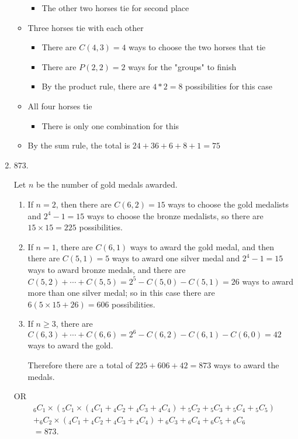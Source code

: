 \documentclass{../../cls/sig-alternate-05-2015}
\begin{document}
\begin{enumerate}
\begin{itemize}
\begin{itemize}
                \item  The other two horses tie for second place
            \end{itemize}        
        \item  Three horses tie with each other
            \begin{itemize}
                \item There are $C(4,3) = 4$ ways to choose the two horses that tie
                
                \item There are $P(2,2) = 2$ ways for the "groups" to finish
                
                \item  By the product rule, there are $4*2 = 8$ possibilities for this case
            \end{itemize}        
        \item All four horses tie
            \begin{itemize}
                \item There is only one combination for this
            \end{itemize}        
        \item By the sum rule, the total is $ 24+36+6+8+1 = 75$
    \end{itemize}
    
    \item 873.
    
    Let $n$ be the number of gold medals awarded.
    \begin{enumerate}
        \item If $n=2$, then there are $C(6,2)=15$ ways to choose the gold medalists and $2^4-1=15$ ways to choose the bronze medalists, so there are $15\times 15=225$ possibilities.
        
        \item If $n=1$, there are $C(6,1)$ ways to award the gold medal, and then there are $C(5,1)=5$ ways to award one silver medal and $2^4-1=15$ ways to award bronze medals, and there are $C(5,2)+ \cdots + C(5,5)=2^5-C(5,0)-C(5,1)=26$ ways to award more than one silver medal; so in this case there are $6(5\times 15 + 26)=606$ possibilities.
        
        \item If $n\geq3$, there are $C(6,3)+\cdots +C(6,6)=2^6-C(6,2)-C(6,1)-C(6,0)=42$ ways to award the gold.
        
        Therefore there are a total of $225+606+42=873$ ways to award the medals.
    \end{enumerate}

OR
 \begin{multline}
        {}_6 C_1 \times ({}_5 C_1 \times ({}_4 C_1 + {}_4 C_2 + {}_4 C_3 + {}_4 C_4) + {}_5 C_2 + {}_5 C_3 + {}_5 C_4 + {}_5 C_5)\\
        + {}_6 C_2 \times ({}_4 C_1 + {}_4 C_2 + {}_4 C_3 + {}_4 C_4) + {}_6 C_3 + {}_6 C_4 + {}_6 C_5 + {}_6 C_6\\
        = 873.
    \end{multline}
\end{enumerate}
\end{document}

